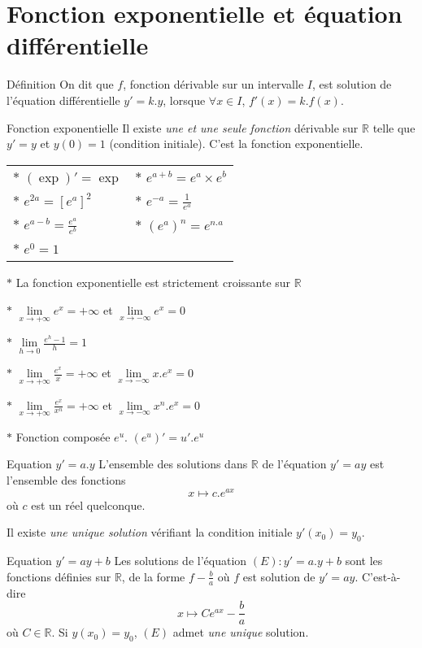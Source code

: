 \section{Fonction exponentielle et équation différentielle}
\begin{bclogo}{Définition}
On dit que $f$, fonction dérivable sur un intervalle $I$, est solution de l'équation différentielle $y'=k.y$, lorsque $\forall x\in I$, $f'(x)=k.f(x)$.
\end{bclogo}



\begin{bclogo}{Fonction exponentielle}
Il existe \emph{une et une seule fonction} dérivable sur $\mathbb{R}$ telle que $y'=y$ et $y(0)=1$ (condition initiale). C'est la fonction exponentielle.

\begin{center}
\begin{tabular}{ll}
$\ast$ $(\exp )'=\exp $&$\ast$ $e^{a+b}=e^a \times e^b$\\

$\ast$ $e^{2a}=\left[ e^a\right] ^2$&$\ast$ $e^{-a}=\frac{1}{e^a}$\\

$\ast$ $e^{a-b}=\frac{e^a}{e^b}$&$\ast$ $\left( e^a\right) ^n=e^{n.a}$\\

$\ast$ $e^0=1$
\end{tabular}
\end{center}
$\ast$ La fonction exponentielle est strictement croissante sur $\mathbb {R}$

$\ast$ $\lim\limits_{x\to +\infty} e^x=+\infty$ et $\lim\limits_{x\to -\infty} e^x=0$

$\ast$ $\lim\limits_{h\to 0} \frac{e^h-1}{h}=1$

$\ast$ $\lim\limits_{x\to +\infty} \frac{e^x}{x}=+\infty$ et $\lim\limits_{x\to -\infty} x.e^x=0$

$\ast$ $\lim\limits_{x\to +\infty}\frac{e^x}{x^n}=+\infty$ et $\lim\limits_{x\to -\infty} x^n.e^x=0$

$\ast$ Fonction composée $e^u$. $\left( e^u\right)'=u'.e^u$ 

\end{bclogo}

\medskip

\begin{bclogo}{Equation $y'=a.y$}
L'ensemble des solutions dans $\mathbb{R}$ de l'équation $y'=ay$ est l'ensemble des fonctions \[x\mapsto c.e^{ax}\] où $c$ est un réel quelconque.

Il existe \emph{une unique solution} vérifiant la condition initiale $y'(x_0)=y_0$.
\end{bclogo}

\medskip

\begin{bclogo}{Equation $y'=ay+b$}
Les solutions de l'équation $(E):y'=a.y+b$ sont les fonctions définies sur $\mathbb{R}$, de la forme $f-\frac{b}{a}$ où $f$ est solution de $y'=ay$. C'est-à-dire
\[x\mapsto Ce^{ax}-\frac{b}{a}\]
où $C\in\mathbb{R}$. Si $y(x_0)=y_0$, $(E)$ admet \emph{une unique} solution.
\end{bclogo}
